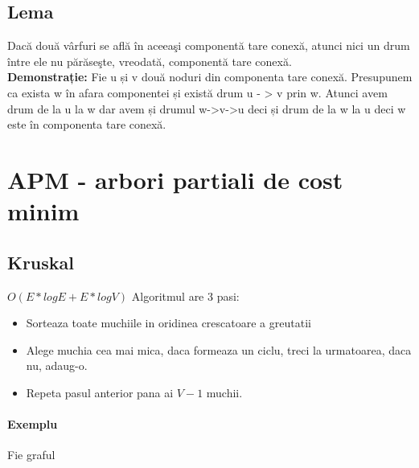 \documentclass{article}
\begin{document}
\subsection*{Lema} Dacă două vârfuri se află în aceeaşi componentă tare conexă, atunci
nici un drum între ele nu părăseşte, vreodată, componentă tare conexă.
\\
\textbf{Demonstrație:} Fie u și v două noduri din componenta tare conexă.
Presupunem ca exista w în afara componentei și există drum u - > v prin w.
Atunci avem drum de la u la w dar avem și drumul w->v->u deci și drum de la
w la u deci w este în componenta tare conexă.

\section{APM - arbori partiali de cost minim}
\subsection*{Kruskal} $O(E*log E+ E*log V)$ Algoritmul are 3 pasi:
\begin{itemize}
    \item Sorteaza toate muchiile in oridinea crescatoare a greutatii
    \item Alege muchia cea mai mica, daca formeaza un ciclu, treci la urmatoarea, daca nu, adaug-o.
    \item Repeta pasul anterior pana ai $V - 1$ muchii.
\end{itemize}

\paragraph*{Exemplu} Fie graful

\begin{center}
\end{center}
\end{document}
